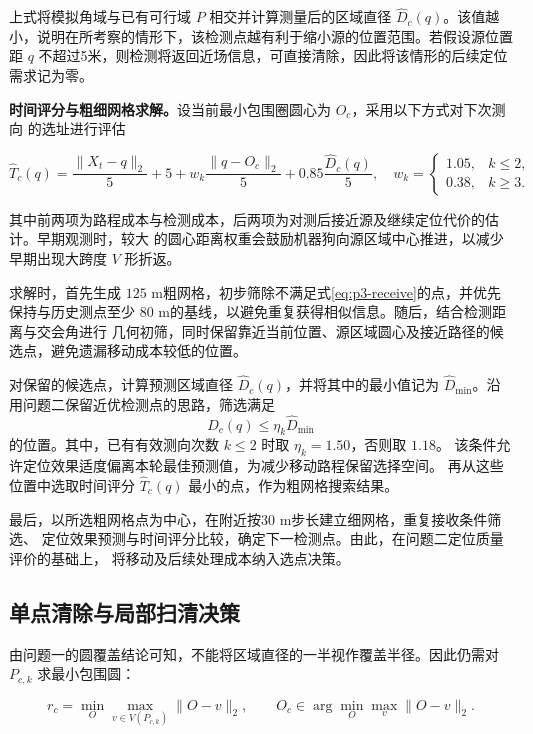 \documentclass[withoutpreface,bwprint]{cumcmthesis} %
\begin{document}
上式将模拟角域与已有可行域 $P$ 相交并计算测量后的区域直径 $\widehat D_c(q)$。该值越小，说明在所考察的情形下，该检测点越有利于缩小源的位置范围。若假设源位置距
$q$ 不超过5米，则检测将返回近场信息，可直接清除，因此将该情形的后续定位需求记为零。

\textbf{时间评分与粗细网格求解。}设当前最小包围圈圆心为 $O_c$，采用以下方式对下次测向
的选址进行评估

\begin{equation}\label{eq:p3-score}
\widehat T_c(q)=\frac{\|X_t-q\|_2}{5}+5
+w_k\frac{\|q-O_c\|_2}{5}+0.85\frac{\widehat D_c(q)}{5},
\quad
w_k=\begin{cases}1.05,&k\le2,\\0.38,&k\ge3.\end{cases}
\end{equation}

其中前两项为路程成本与检测成本，后两项为对测后接近源及继续定位代价的估计。早期观测时，较大
的圆心距离权重会鼓励机器狗向源区域中心推进，以减少早期出现大跨度 $V$ 形折返。

求解时，首先生成 $125$ m粗网格，初步筛除不满足式\eqref{eq:p3-receive}的点，并优先
保持与历史测点至少 $80$ m的基线，以避免重复获得相似信息。随后，结合检测距离与交会角进行
几何初筛，同时保留靠近当前位置、源区域圆心及接近路径的候选点，避免遗漏移动成本较低的位置。

对保留的候选点，计算预测区域直径 $\widehat D_c(q)$，并将其中的最小值记为
$\widehat D_{\min}$。沿用问题二保留近优检测点的思路，筛选满足
\[
\widehat D_c(q)\le\eta_k\widehat D_{\min}
\]
的位置。其中，已有有效测向次数 $k\le2$ 时取 $\eta_k=1.50$，否则取 $1.18$。
该条件允许定位效果适度偏离本轮最佳预测值，为减少移动路程保留选择空间。
再从这些位置中选取时间评分 $\widehat T_c(q)$ 最小的点，作为粗网格搜索结果。

最后，以所选粗网格点为中心，在附近按30 m步长建立细网格，重复接收条件筛选、
定位效果预测与时间评分比较，确定下一检测点。由此，在问题二定位质量评价的基础上，
将移动及后续处理成本纳入选点决策。

\subsection{单点清除与局部扫清决策}

由问题一的圆覆盖结论可知，不能将区域直径的一半视作覆盖半径。因此仍需对 $P_{c,k}$ 求最小包围圆：

\begin{equation}\label{eq:p3-mec}
r_c=\min_O\max_{v\in V(P_{c,k})}\|O-v\|_2,\qquad O_c\in\arg\min_O\max_v\|O-v\|_2.
\end{equation}
\end{document}
